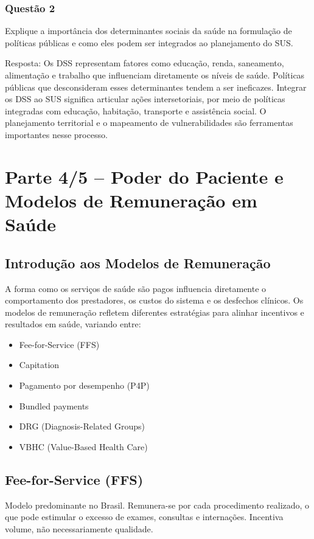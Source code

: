 \documentclass[a4paper,12pt]{article}
\begin{document}
\subsubsection{Questão 2}
\label{sec:org63649b0}
Explique a importância dos determinantes sociais da saúde na formulação de políticas públicas e como eles podem ser integrados ao planejamento do SUS.

Resposta:
Os DSS representam fatores como educação, renda, saneamento, alimentação e trabalho que influenciam diretamente os níveis de saúde. Políticas públicas que desconsideram esses determinantes tendem a ser ineficazes. Integrar os DSS ao SUS significa articular ações intersetoriais, por meio de políticas integradas com educação, habitação, transporte e assistência social. O planejamento territorial e o mapeamento de vulnerabilidades são ferramentas importantes nesse processo.
\section{Parte 4/5 – Poder do Paciente e Modelos de Remuneração em Saúde}
\label{sec:orgea4af87}

\subsection{Introdução aos Modelos de Remuneração}
\label{sec:org490d0cb}
A forma como os serviços de saúde são pagos influencia diretamente o comportamento dos prestadores, os custos do sistema e os desfechos clínicos. Os modelos de remuneração refletem diferentes estratégias para alinhar incentivos e resultados em saúde, variando entre:
\begin{itemize}
\item Fee-for-Service (FFS)
\item Capitation
\item Pagamento por desempenho (P4P)
\item Bundled payments
\item DRG (Diagnosis-Related Groups)
\item VBHC (Value-Based Health Care)
\end{itemize}
\subsection{Fee-for-Service (FFS)}
\label{sec:org4989ffe}
Modelo predominante no Brasil. Remunera-se por cada procedimento realizado, o que pode estimular o excesso de exames, consultas e internações. Incentiva volume, não necessariamente qualidade.
\end{document}
